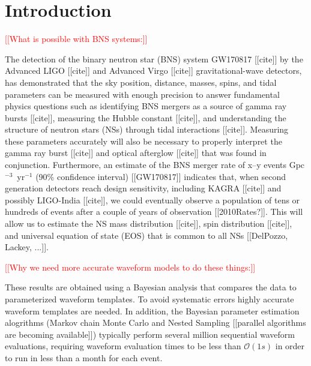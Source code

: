 \documentclass[prd,aps,letter,twocolumn,floatfix,notitlepage,nofootinbib]{revtex4-1}
\newcommand{\red}[1]{\textcolor{red}{#1}}
\begin{document}
\maketitle


\section{Introduction}

\red{[[What is possible with BNS systems:]]}

The detection of the binary neutron star (BNS) system GW170817 [[cite]] by the Advanced LIGO [[cite]] and Advanced Virgo [[cite]] gravitational-wave detectors, has demonstrated that the sky position, distance, masses, spins, and tidal parameters can be measured with enough precision to answer fundamental physics questions such as identifying BNS mergers as a source of gamma ray bursts [[cite]], measuring the Hubble constant [[cite]], and understanding the structure of neutron stars (NSs) through tidal interactions [[cite]]. Measuring these parameters accurately will also be necessary to properly interpret the gamma ray burst [[cite]] and optical afterglow [[cite]] that was found in conjunction. Furthermore, an estimate of the BNS merger rate of x--y events Gpc$^{-3}$~yr$^{-1}$ (90\% confidence interval) [[GW170817]] indicates that, when second generation detectors reach design sensitivity, including KAGRA [[cite]] and possibly LIGO-India [[cite]], we could eventually observe a population of tens or hundreds of events after a couple of years of observation [[2010Rates?]]. This will allow us to estimate the NS mass distribution [[cite]], spin distribution [[cite]], and universal equation of state (EOS) that is common to all NSs [[DelPozzo, Lackey, ...]]. 

\red{[[Why we need more accurate waveform models to do these things:]]}

These results are obtained using a Bayesian analysis that compares the data to parameterized waveform templates. To avoid systematic errors highly accurate waveform templates are needed. In addition, the Bayesian parameter estimation alogrithms (Markov chain Monte Carlo and Nested Sampling [[parallel algorithms are becoming available]]) typically perform several million sequential waveform evaluations, requiring waveform evaluation times to be less than $\mathcal{O}(1s)$ in order to run in less than a month for each event.
\end{document}
